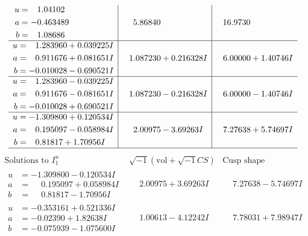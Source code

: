 \documentclass[1p]{elsarticle_modified}
\theoremstyle{definition}
\newcommand{\I}{\sqrt{-1}}
\begin{document}
$$\begin{array}{c|c|c}
\begin{aligned}
u &= \phantom{-}1.04102\phantom{ +0.000000I} \\
a &= -0.463489\phantom{ +0.000000I} \\
b &= \phantom{-}1.08686\phantom{ +0.000000I}\end{aligned}
 & \phantom{-}5.86840\phantom{ +0.000000I} & \phantom{-}16.9730\phantom{ +0.000000I} \\ \hline\begin{aligned}
u &= \phantom{-}1.283960 + 0.039225 I \\
a &= \phantom{-}0.911676 + 0.081651 I \\
b &= -0.010028 - 0.690521 I\end{aligned}
 & \phantom{-}1.087230 + 0.216328 I & \phantom{-}6.00000 + 1.40746 I \\ \hline\begin{aligned}
u &= \phantom{-}1.283960 - 0.039225 I \\
a &= \phantom{-}0.911676 - 0.081651 I \\
b &= -0.010028 + 0.690521 I\end{aligned}
 & \phantom{-}1.087230 - 0.216328 I & \phantom{-}6.00000 - 1.40746 I \\ \hline\begin{aligned}
u &= -1.309800 + 0.120534 I \\
a &= \phantom{-}0.195097 - 0.058984 I \\
b &= \phantom{-}0.81817 + 1.70956 I\end{aligned}
 & \phantom{-}2.00975 - 3.69263 I & \phantom{-}7.27638 + 5.74697 I\\
 \hline 
 \end{array}$$\newpage$$\begin{array}{c|c|c}  
\text{Solutions to }I^u_{1}& \I (\text{vol} + \sqrt{-1}CS) & \text{Cusp shape}\\
 \hline 
\begin{aligned}
u &= -1.309800 - 0.120534 I \\
a &= \phantom{-}0.195097 + 0.058984 I \\
b &= \phantom{-}0.81817 - 1.70956 I\end{aligned}
 & \phantom{-}2.00975 + 3.69263 I & \phantom{-}7.27638 - 5.74697 I \\ \hline\begin{aligned}
u &= -0.353161 + 0.521336 I \\
a &= -0.02390 + 1.82638 I \\
b &= -0.075939 - 1.075600 I\end{aligned}
 & \phantom{-}1.00613 - 4.12242 I & \phantom{-}7.78031 + 7.98947 I \\ \hline\begin{aligned}

\end{aligned}
\end{array}$$
\end{document}
